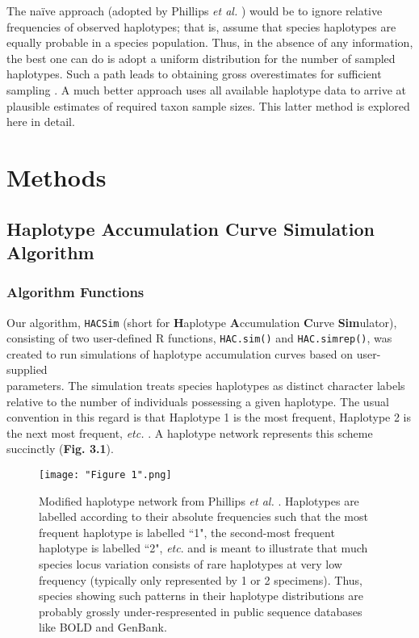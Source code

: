 The na{\"i}ve approach (adopted by Phillips \textit{et al.} \cite{phillips2015exploration}) would be to ignore relative frequencies of observed haplotypes; that is, assume that species haplotypes are equally probable in a species population. Thus, in the absence of any information, the best one can do is adopt a uniform distribution for the number of sampled haplotypes. Such a path leads to obtaining gross overestimates for sufficient sampling \cite{phillips2015exploration}. A much better approach uses all available haplotype data to arrive at plausible estimates of required taxon sample sizes. This latter method is explored here in detail.


\section{Methods}

\subsection{Haplotype Accumulation Curve Simulation Algorithm}

\subsubsection{Algorithm Functions}

Our algorithm, {\tt HACSim} (short for \textbf{H}aplotype \textbf{A}ccumulation \textbf{C}urve \textbf{Sim}ulator), \\ consisting of two user-defined R functions, {\tt HAC.sim()} and {\tt HAC.simrep()}, was \\ created to run simulations of haplotype accumulation curves based on user-supplied 
\\ parameters. The simulation treats species haplotypes as distinct character labels relative to the number of individuals possessing a given haplotype. The usual convention in this regard is that Haplotype 1 is the most frequent, Haplotype 2 is the next most frequent, \textit{etc.} \cite{gwiazdowski2013phylogeographic}. A haplotype network represents this scheme succinctly (\textbf{Fig. 3.1}). 


\begin{figure}[H]

\centering

\texttt{[image: "Figure 1".png]}

\caption{Modified haplotype network from Phillips \textit{et al.} \cite{phillips2019incomplete}. Haplotypes are labelled according to their absolute frequencies such that the most frequent haplotype is labelled ``1", the second-most frequent haplotype is labelled ``2", \textit{etc}. and is meant to illustrate that much species locus variation consists of rare haplotypes at very low frequency (typically only represented by 1 or 2 specimens). Thus, species showing such patterns in their haplotype distributions are probably grossly under-respresented in public sequence databases like BOLD and GenBank.}

\end{figure}


